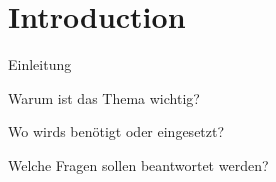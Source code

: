 \section{Introduction}
\label{sec:introduction}
Einleitung

Warum ist das Thema wichtig?

Wo wirds benötigt oder eingesetzt?

Welche Fragen sollen beantwortet werden?